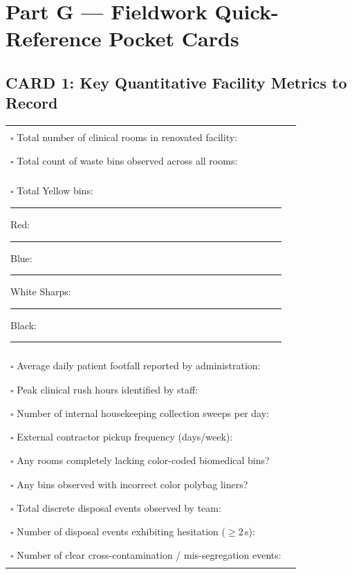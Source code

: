 \documentclass[11pt,a4paper]{article}
\begin{document}
\section{Part G --- Fieldwork Quick-Reference Pocket Cards}

\subsection{CARD 1: Key Quantitative Facility Metrics to Record}
\begin{infobox}
\small
\begin{tabularx}{\textwidth}{Xl}
$\square$ Total number of clinical rooms in renovated facility: & \rule{3cm}{0.4pt} \\
$\square$ Total count of waste bins observed across all rooms: & \rule{3cm}{0.4pt} \\
$\square$ Total Yellow bins: \rule{1cm}{0.4pt} \quad Red: \rule{1cm}{0.4pt} \quad Blue: \rule{1cm}{0.4pt} \quad White Sharps: \rule{1cm}{0.4pt} \quad Black: \rule{1cm}{0.4pt} & \\
$\square$ Average daily patient footfall reported by administration: & \rule{3cm}{0.4pt} \\
$\square$ Peak clinical rush hours identified by staff: & \rule{3cm}{0.4pt} \\
$\square$ Number of internal housekeeping collection sweeps per day: & \rule{3cm}{0.4pt} \\
$\square$ External contractor pickup frequency (days/week): & \rule{3cm}{0.4pt} \\
$\square$ Any rooms completely lacking color-coded biomedical bins? & \rule{3cm}{0.4pt} \\
$\square$ Any bins observed with incorrect color polybag liners? & \rule{3cm}{0.4pt} \\
$\square$ Total discrete disposal events observed by team: & \rule{3cm}{0.4pt} \\
$\square$ Number of disposal events exhibiting hesitation ($\ge 2$\,s): & \rule{3cm}{0.4pt} \\
$\square$ Number of clear cross-contamination / mis-segregation events: & \rule{3cm}{0.4pt} \\
\end{tabularx}
\end{infobox}
\end{document}
